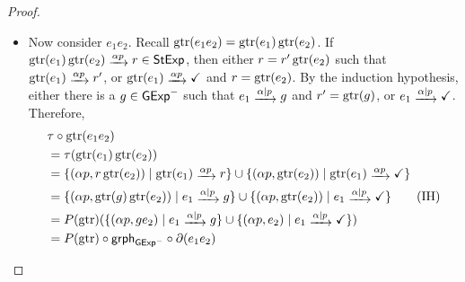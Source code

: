 \documentclass[orivec,envcountsect,envcountsame]{llncs}
\begin{document}
\begin{proof}
\begin{itemize}
\begin{equation}
		\end{equation}
		Now, \(\gtr(e_1 +_b e_2) = b \cdot \gtr(e_1) + \bar b \cdot \gtr(e_2)\), and by the induction hypothesis, \(\gtr(e_i) \tr{\alpha p} r \in \SExp\) if and only if there is a \(g \in \GExp^-\) such that \(e_i \tr{\alpha \mid p} g\) and \(r = \gtr(g)\).
		This implies that \(b \cdot \gtr(e_1) \tr{\alpha p} r\) if and only if \(\alpha \le b\) and \(\gtr(e_i) \tr{\alpha p} \gtr(g)\) where \(e_i \tr{\alpha \mid p} g\).
		Therefore,
		\begin{align*}
			&\tau\circ\gtr(e_1 +_b e_2) \\
			&= \tau(b \cdot \gtr(e_1) + \bar b \cdot \gtr(e_2)) \\
			&= \{(\alpha p, \gtr(g)) \mid \alpha \le b, e_1 \tr{\alpha\mid p} g\} \cup \{(\alpha p, \checkmark) \mid \alpha \le b, e_1 \tr{\alpha \mid p} \checkmark\} \tag{IH}\\
			&\hspace*{4em}\cup \{(\alpha p, \gtr(g)) \mid \alpha \le \bar b, e_2 \tr{\alpha \mid p} g\} \cup \{(\alpha p, \checkmark) \mid \alpha \le \bar b, e_2 \tr{\alpha \mid p} \checkmark\} \\
			&= P(\gtr)(\{(\alpha p, g) \mid \alpha \le b, e_1 \tr{\alpha\mid p} g\} \cup \{(\alpha p, \checkmark) \mid \alpha \le b, e_1 \tr{\alpha \mid p} \checkmark\} \\
			&\hspace*{4em}\cup \{(\alpha p, g) \mid \alpha \le \bar b, e_2 \tr{\alpha \mid p} g\} \cup \{(\alpha p, \checkmark) \mid \alpha \le \bar b, e_2 \tr{\alpha \mid p} \checkmark\}) \\
			&= P(\gtr) \circ \grph_{\GExp^-} \circ \partial(e_1 +_b e_2) \tag{by~\eqref{graph eq 1}}
		\end{align*}

		\item Now consider \(e_1e_2\).
		Recall \(\operatorname{gtr}(e_1e_2) = \operatorname{gtr}(e_1)\operatorname{gtr}(e_2)\).
		If \(\gtr(e_1)\gtr(e_2) \tr{\alpha p} r \in \SExp\), then either \(r = r' \operatorname{gtr}(e_2)\) such that \(\gtr(e_1) \tr{\alpha p} r'\), or \(\gtr(e_1) \tr{\alpha p} \checkmark\) and \(r = \operatorname{gtr}(e_2)\).
		By the induction hypothesis, either there is a \(g \in \GExp^-\) such that \(e_1 \tr{\alpha \mid p} g\) and \(r' = \operatorname{gtr}(g)\), or \(e_1 \tr{\alpha \mid p} \checkmark\).
		Therefore,
		\begin{align*}
			&\tau \circ \gtr(e_1e_2) \\
			&= \tau(\gtr(e_1)\gtr(e_2)) \\
			&= \{(\alpha p, r \gtr(e_2)) \mid \gtr(e_1) \tr{\alpha p} r\} \cup \{(\alpha p, \gtr(e_2)) \mid \gtr(e_1) \tr{\alpha p} \checkmark\} \\
			&= \{(\alpha p, \gtr(g) \gtr(e_2)) \mid e_1 \tr{\alpha \mid p} g\} \cup \{(\alpha p, \gtr(e_2)) \mid e_1 \tr{\alpha \mid p} \checkmark\} \tag{IH} \\
			&= P(\gtr)(\{(\alpha p, g e_2) \mid e_1 \tr{\alpha \mid p} g\} \cup \{(\alpha p, e_2) \mid e_1 \tr{\alpha \mid p} \checkmark\}) \\
			&= P(\gtr)\circ\grph_{\GExp^-}\circ\partial(e_1e_2)
		\end{align*}


\end{itemize}
\end{proof}
\end{document}
